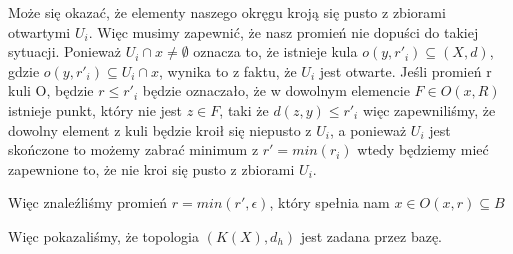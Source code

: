 \documentclass[12pt,a4paper]{article}
\begin{document}
\begin{enumerate}
    Może się okazać, że elementy naszego okręgu kroją się pusto z zbiorami otwartymi $U_i$. Więc musimy zapewnić, że nasz promień nie dopuści do takiej sytuacji. Ponieważ $U_i \cap x \neq \emptyset$ oznacza to, że istnieje kula $o(y,r'_i) \subseteq (X,d)$, gdzie $o(y,r'_i) \subseteq U_i \cap x$, wynika to z faktu, że $U_i$ jest otwarte. Jeśli promień r kuli O, będzie $r \leq r'_i$ będzie oznaczało, że w dowolnym elemencie $F \in O(x,R)$ istnieje punkt, który nie jest $z \in F$, taki że $d(z,y) \leq r'_i$ więc zapewniliśmy, że dowolny element z kuli będzie kroił się niepusto z $U_i$, a ponieważ $U_i$ jest skończone to możemy zabrać minimum z $r' = min(r_i)$ wtedy będziemy mieć zapewnione to, że nie kroi się pusto z zbiorami $U_i$.
    
    Więc znaleźliśmy promień $r = min(r', \epsilon)$, który spełnia nam $x \in O(x,r) \subseteq B$
    \end{enumerate}
    Więc pokazaliśmy, że topologia $(K(X), d_h)$ jest zadana przez bazę.
\end{document}
